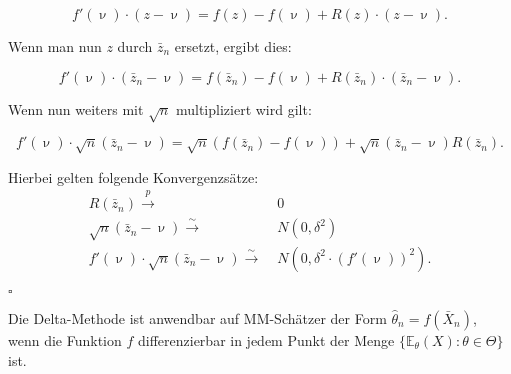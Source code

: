 \documentclass[10pt]{article}
\newcommand{\EW}{\mathbb{E}} %
\newcommand{\KW}{\overset{p} \longrightarrow} %
\newcommand{\KV}{\overset{\sim} \longrightarrow} %
\newenvironment{BWS}[1][]
{\begin{Beweis}[frametitle=#1]}{\end{Beweis}}
\begin{document}
\begin{BWS}[Beweis 1.3.1 Delta-Methode]
		\begin{equation*}
			f'(\upnu) \cdot (z-\upnu) = f(z) - f(\upnu) + R(z) \cdot (z-\upnu).
		\end{equation*}
		
		Wenn man nun $z$ durch $\bar{z}_n$ ersetzt, ergibt dies:
		
		
		\begin{equation*}
			f'(\upnu) \cdot (\bar{z}_n-\upnu) = f(\bar{z}_n) - f(\upnu) + R(\bar{z}_n) \cdot (\bar{z}_n-\upnu).			
		\end{equation*}
		
		Wenn nun weiters mit $\sqrt{n}$ multipliziert wird gilt:
		
		\begin{equation*}
			f'(\upnu) \cdot\sqrt{n} (\bar{z}_n-\upnu) = \sqrt{n}(f(\bar{z}_n) - f(\upnu)) + \sqrt{n} (\bar{z}_n-\upnu)	R(\bar{z}_n).
		\end{equation*}
		
		Hierbei gelten folgende Konvergenzsätze:
		\begin{equation*}
			\begin{split}
			R(\bar{z}_n) \KW& \;0\\
			\sqrt{n} (\bar{z}_n-\upnu) \KV& \;N(0,\delta^2)\\
			f'(\upnu) \cdot\sqrt{n} (\bar{z}_n-\upnu) \KV& \;N(0,\delta^2 \cdot (f'(\upnu))^2).
			\end{split}
		\end{equation*}
		\begin{flushright}
			$\square$
		\end{flushright}
		
	\end{BWS}
	
	\noindent Die Delta-Methode ist anwendbar auf MM-Schätzer der Form $\hat{\theta}_n = f(\bar{X}_n)$, wenn die Funktion $f$ differenzierbar in jedem Punkt der Menge $\{\EW_\theta(X) : \theta \in \Theta\}$ ist.
	
	
	
\end{document}
